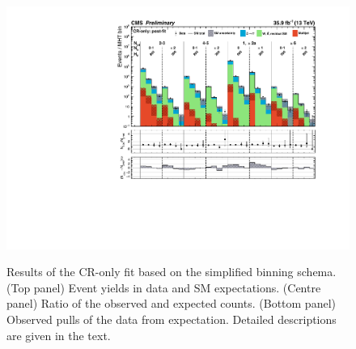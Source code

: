 \begin{figure}[h!]
  \centering
  \caption{Results of the CR-only fit based on the simplified binning
    schema. (Top panel) Event yields in data and SM
    expectations. (Centre panel) Ratio of the observed and expected
    counts. (Bottom panel) Observed pulls of the data from
    expectation. Detailed descriptions are given in the text.
  }
  \includegraphics[width=0.95\linewidth]{figures/results/36invfb_preapproval/aggregated/aggregate_cr-only.pdf} 
  \label{fig:aggregated_results}
\end{figure}

